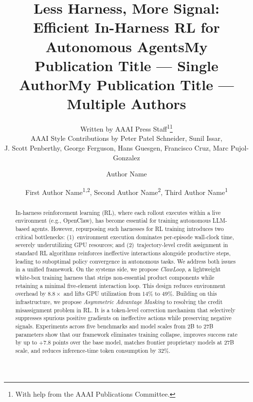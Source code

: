 \documentclass[letterpaper]{article} %
\title{Less Harness, More Signal: Efficient In-Harness RL for Autonomous Agents}
\author{
    Written by AAAI Press Staff\textsuperscript{\rm 1}\thanks{With help from the AAAI Publications Committee.}\\
    AAAI Style Contributions by Peter Patel Schneider,
    Sunil Issar,\\
    J. Scott Penberthy,
    George Ferguson,
    Hans Guesgen,
    Francisco Cruz\equalcontrib\corresponding,
    Marc Pujol-Gonzalez\equalcontrib\corresponding
}
\title{My Publication Title --- Single Author}
\author {
    Author Name
}
\title{My Publication Title --- Multiple Authors}
\author {
    First Author Name\textsuperscript{\rm 1,\rm 2}\equalcontrib,
    Second Author Name\textsuperscript{\rm 2}\equalcontrib,
    Third Author Name\textsuperscript{\rm 1}\corresponding
}
\begin{document}
\maketitle

\begin{abstract}
In-harness reinforcement learning (RL), where each rollout executes within a live environment (e.g., OpenClaw), has become essential for training autonomous LLM-based agents.
However, repurposing such harnesses for RL training introduces two critical bottlenecks:
(1)~environment execution dominates per-episode wall-clock time, severely underutilizing GPU resources; 
and (2)~trajectory-level credit assignment in standard RL algorithms reinforces ineffective interactions alongside productive steps, leading to suboptimal policy convergence in autonomous tasks. 
We address both issues in a unified framework. 
On the systems side, we propose \textit{ClawLoop}, a lightweight white-box training harness that strips non-essential product components while retaining a minimal five-element interaction loop.
This design reduces environment overhead by $8.8\times$ and lifts GPU utilization from 14\% to 49\%. 
Building on this infrastructure, we propose \emph{Asymmetric Advantage Masking} to resolving the credit misassignment problem in RL.
It is a token-level correction mechanism that selectively suppresses spurious positive gradients on ineffective actions while preserving negative signals. 
Experiments across five benchmarks and model scales from 2B to 27B parameters show that our framework eliminates training collapse, improves success rate by up to $+7.8$ points over the base model, matches frontier proprietary models at 27B scale, and reduces inference-time token consumption by 32\%.

\end{abstract}

\end{document}
